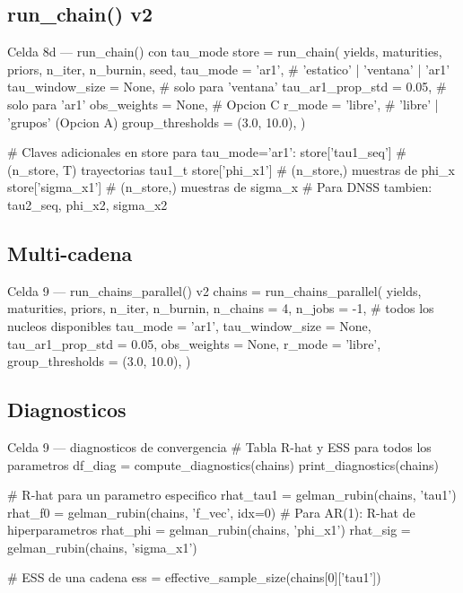 \documentclass[12pt, a4paper]{article}
\theoremstyle{plain}
\theoremstyle{definition}
\theoremstyle{remark}
\begin{document}
\subsection{run\_chain() v2}

\begin{codigocaja}{Celda 8d --- run\_chain() con tau\_mode}
store = run_chain(
    yields, maturities, priors, n_iter, n_burnin, seed,
    tau_mode         = 'ar1',    # 'estatico' | 'ventana' | 'ar1'
    tau_window_size  = None,     # solo para 'ventana'
    tau_ar1_prop_std = 0.05,     # solo para 'ar1'
    obs_weights      = None,     # Opcion C
    r_mode           = 'libre',  # 'libre' | 'grupos' (Opcion A)
    group_thresholds = (3.0, 10.0),
)

# Claves adicionales en store para tau_mode='ar1':
store['tau1_seq']   # (n_store, T)  trayectorias tau1_t
store['phi_x1']     # (n_store,)    muestras de phi_x
store['sigma_x1']   # (n_store,)    muestras de sigma_x
# Para DNSS tambien: tau2_seq, phi_x2, sigma_x2
\end{codigocaja}

\subsection{Multi-cadena}

\begin{codigocaja}{Celda 9 --- run\_chains\_parallel() v2}
chains = run_chains_parallel(
    yields, maturities, priors, n_iter, n_burnin,
    n_chains         = 4,
    n_jobs           = -1,       # todos los nucleos disponibles
    tau_mode         = 'ar1',
    tau_window_size  = None,
    tau_ar1_prop_std = 0.05,
    obs_weights      = None,
    r_mode           = 'libre',
    group_thresholds = (3.0, 10.0),
)
\end{codigocaja}

\subsection{Diagnosticos}

\begin{codigocaja}{Celda 9 --- diagnosticos de convergencia}
# Tabla R-hat y ESS para todos los parametros
df_diag = compute_diagnostics(chains)
print_diagnostics(chains)

# R-hat para un parametro especifico
rhat_tau1 = gelman_rubin(chains, 'tau1')
rhat_f0   = gelman_rubin(chains, 'f_vec', idx=0)
# Para AR(1): R-hat de hiperparametros
rhat_phi  = gelman_rubin(chains, 'phi_x1')
rhat_sig  = gelman_rubin(chains, 'sigma_x1')

# ESS de una cadena
ess = effective_sample_size(chains[0]['tau1'])
\end{codigocaja}
\end{document}
